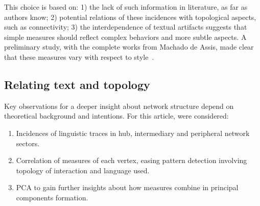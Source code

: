 \documentclass[%
 aip,
 jmp,%
 amsmath,amssymb,
 reprint,%
]{revtex4-1}
\begin{document}
This choice is based on: 1) the lack of such information in literature, as far as authors know; 
2) potential relations of these incidences with topological aspects, such as connectivity; 3) the interdependence of textual artifacts suggests that simple measures should reflect complex behaviors and more subtle aspects.
A preliminary study, with the complete works from Machado de Assis, made clear that these measures vary with respect to style~\cite{letrasMachado}.

%
\subsection{Relating text and topology}
Key observations for a deeper insight about network structure depend on
theoretical background and intentions. For this article, were considered:
\begin{enumerate}
    \item Incidences of linguistic traces in hub, intermediary and peripheral network sectors.
    \item Correlation of measures of each vertex, easing pattern detection involving topology of interaction and language used.
    \item PCA to gain further insights about how measures combine in principal components formation.
\end{enumerate}
\end{document}
